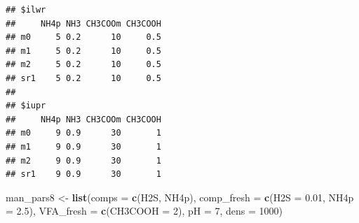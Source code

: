 \documentclass[
]{article}
\newenvironment{Shaded}{\begin{snugshade}}{\end{snugshade}}
\newcommand{\AttributeTok}[1]{\textcolor[rgb]{0.13,0.29,0.53}{#1}}
\newcommand{\DecValTok}[1]{\textcolor[rgb]{0.00,0.00,0.81}{#1}}
\newcommand{\FloatTok}[1]{\textcolor[rgb]{0.00,0.00,0.81}{#1}}
\newcommand{\FunctionTok}[1]{\textcolor[rgb]{0.13,0.29,0.53}{\textbf{#1}}}
\newcommand{\NormalTok}[1]{#1}
\newcommand{\OtherTok}[1]{\textcolor[rgb]{0.56,0.35,0.01}{#1}}
\newcommand{\StringTok}[1]{\textcolor[rgb]{0.31,0.60,0.02}{#1}}
\begin{document}
\begin{verbatim}
## $ilwr
##     NH4p NH3 CH3COOm CH3COOH
## m0     5 0.2      10     0.5
## m1     5 0.2      10     0.5
## m2     5 0.2      10     0.5
## sr1    5 0.2      10     0.5
## 
## $iupr
##     NH4p NH3 CH3COOm CH3COOH
## m0     9 0.9      30       1
## m1     9 0.9      30       1
## m2     9 0.9      30       1
## sr1    9 0.9      30       1
\end{verbatim}

\begin{Shaded}
\begin{Highlighting}[]
\NormalTok{man\_pars8 }\OtherTok{\textless{}{-}} \FunctionTok{list}\NormalTok{(}\AttributeTok{comps =} \FunctionTok{c}\NormalTok{(}\StringTok{\textquotesingle{}H2S\textquotesingle{}}\NormalTok{, }\StringTok{\textquotesingle{}NH4p\textquotesingle{}}\NormalTok{),}
                 \AttributeTok{comp\_fresh =} \FunctionTok{c}\NormalTok{(}\AttributeTok{H2S =} \FloatTok{0.01}\NormalTok{, }
                                        \AttributeTok{NH4p =} \FloatTok{2.5}\NormalTok{), }
                 \AttributeTok{VFA\_fresh =} \FunctionTok{c}\NormalTok{(}\AttributeTok{CH3COOH =} \DecValTok{2}\NormalTok{),}
                 \AttributeTok{pH =} \DecValTok{7}\NormalTok{, }\AttributeTok{dens =} \DecValTok{1000}\NormalTok{)}


\end{Highlighting}
\end{Shaded}
\end{document}
